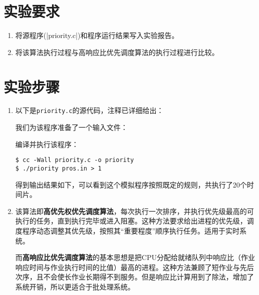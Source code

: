 \documentclass[c5size,a4paper,nofonts]{ctexart}
\begin{document}
\section{实验要求}
\begin{enumerate}[label={(\arabic*)}]
\item 将源程序(|priority.c|)和程序运行结果写入实验报告。
\item 将该算法执行过程与高响应比优先调度算法的执行过程进行比较。
\end{enumerate}

\fi

\section{实验步骤}

\begin{enumerate}

\item 以下是{\tt priority.c}的源代码，注释已详细给出：

{\small\linespread{1}}

我们为该程序准备了一个输入文件：


编译并执行该程序：

\begin{Verbatim}[frame=single]
$ cc -Wall priority.c -o priority
$ ./priority pros.in > 1
\end{Verbatim}

得到输出结果如下，可以看到这个模拟程序按照既定的规则，共执行了20个时间片。


\item 该算法即{\bf 高优先权优先调度算法}，每次执行一次排序，并执行优先级最高的可执行的任务，直到执行完毕或进入阻塞。这种方法要求给出进程的优先级，调度程序动态调整其优先级，按照其“重要程度”顺序执行任务。适用于实时系统。

而{\bf 高响应比优先调度算法}的基本思想是把CPU分配给就绪队列中响应比（作业响应时间与作业执行时间的比值）最高的进程。这种方法兼顾了短作业与先后次序，且不会使长作业长期得不到服务。但是响应比计算用到了除法，增加了系统开销，所以更适合于批处理系统。

\end{enumerate}
\end{document}
